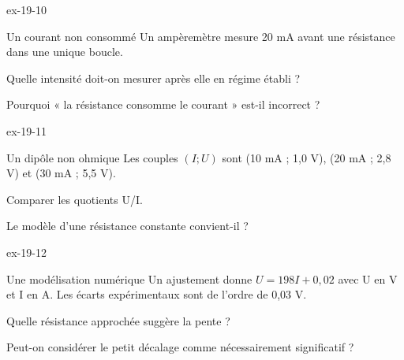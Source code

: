 \begin{blocLivre}{ex-19-10}\begin{exercice}[3]{Un courant non consommé}
Un ampèremètre mesure 20 mA avant une résistance dans une unique boucle.
\begin{questions}
\item Quelle intensité doit-on mesurer après elle en régime établi ?
\item Pourquoi « la résistance consomme le courant » est-il incorrect ?
\end{questions}
\end{exercice}\end{blocLivre}
\begin{blocLivre}{ex-19-11}\begin{exercice}[3]{Un dipôle non ohmique}
Les couples $(I;U)$ sont (10 mA ; 1,0 V), (20 mA ; 2,8 V) et (30 mA ; 5,5 V).
\begin{questions}
\item Comparer les quotients U/I.
\item Le modèle d’une résistance constante convient-il ?
\end{questions}
\end{exercice}\end{blocLivre}
\begin{blocLivre}{ex-19-12}\begin{exercice}[3]{Une modélisation numérique}
Un ajustement donne $U=198I+0,02$ avec U en V et I en A. Les écarts expérimentaux sont de l’ordre de 0,03 V.
\begin{questions}
\item Quelle résistance approchée suggère la pente ?
\item Peut-on considérer le petit décalage comme nécessairement significatif ?
\end{questions}
\end{exercice}\end{blocLivre}

